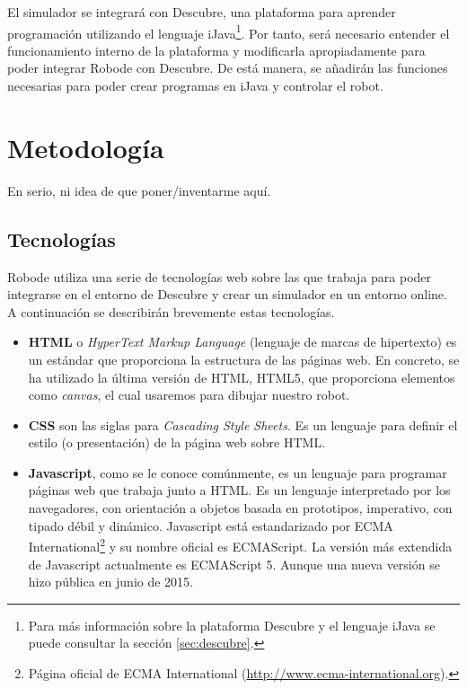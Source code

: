 El simulador se integrará con Descubre, una plataforma para aprender programación utilizando el lenguaje iJava\footnote{Para más información sobre la plataforma Descubre y el lenguaje iJava se puede consultar la sección \ref{sec:descubre}.}. Por tanto, será necesario entender el funcionamiento interno de la plataforma y modificarla apropiadamente para poder integrar Robode con Descubre. De está manera, se añadirán las funciones necesarias para poder crear programas en iJava y controlar el robot.


\section{Metodología}
\label{sec:metodologia}


{\color{red}
En serio, ni idea de que poner/inventarme aquí. 
}


\subsection{Tecnologías}
\label{sec:tecnologias}


Robode utiliza una serie de tecnologías web sobre las que trabaja para poder integrarse en el entorno de Descubre y crear un simulador en un entorno online. A continuación se describirán brevemente estas tecnologías.

\begin{itemize}
	
	\item \textbf{HTML} o \emph{HyperText Markup Language} (lenguaje de marcas de hipertexto)	es un estándar que proporciona la estructura de las páginas web. En concreto, se ha utilizado la última versión de HTML, HTML5, que proporciona elementos como \emph{canvas}, el cual usaremos para dibujar nuestro robot.
	
	\item \textbf{CSS} son las siglas para \emph{Cascading Style Sheets}. Es un lenguaje para definir el estilo (o presentación) de la página web sobre HTML.
	
	\item \textbf{Javascript}, como se le conoce comúnmente, es un lenguaje para programar páginas web que trabaja junto a HTML. Es un lenguaje interpretado por los navegadores, con orientación a objetos basada en prototipos, imperativo, con tipado débil y dinámico. Javascript está estandarizado por ECMA International\footnote{Página oficial de ECMA International (\url{http://www.ecma-international.org}).} y su nombre oficial es ECMAScript. La versión más extendida de Javascript actualmente es ECMAScript 5. Aunque una nueva versión se hizo pública en junio de 2015\cite{ecmascript6}. 
	
\end{itemize}



